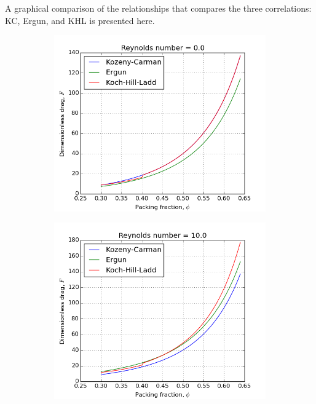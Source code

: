 A graphical comparison of the relationships that compares the three correlations: KC, Ergun, and KHL is presented here.
\begin{figure}[!ht]
    \centering
    \begin{subfigure}[b]{0.45\textwidth}
        \centering
        \includegraphics[width=\textwidth]{figures/pressure-drop-correlations/Re0.png}
    \end{subfigure}
    \begin{subfigure}[b]{0.45\textwidth}
        \centering
        \includegraphics[width=\textwidth]{figures/pressure-drop-correlations/Re10.png}
    \end{subfigure}
    

\end{figure}
